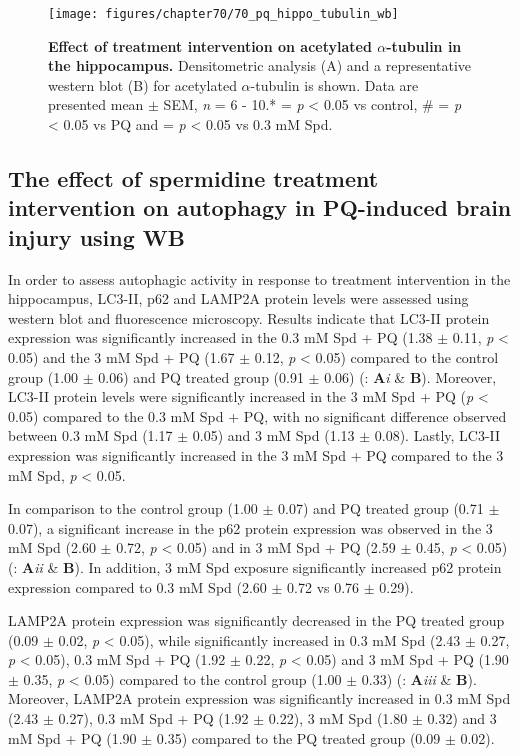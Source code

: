 \begin{figure}[!htbp]
\center
  \texttt{[image: figures/chapter70/70\_pq\_hippo\_tubulin\_wb]}
  \caption[Effect of treatment intervention on acetylated $\alpha$-tubulin expression in the hippocampus]{\textbf{Effect of treatment intervention on acetylated $\alpha$-tubulin in the hippocampus.} Densitometric analysis (A) and a representative western blot (B) for acetylated $\alpha$-tubulin is shown. Data are presented  mean $\pm$ SEM, \textit{n} = 6 - 10.* = \textit{p} < 0.05 vs control, \# = \textit{p} < 0.05 vs PQ and \@ = \textit{p} < 0.05 vs 0.3 mM Spd.}
  \label{fig:70_pq_hippo_tubulin_wb}
\end{figure} 

\subsection{The effect of spermidine treatment intervention on autophagy in PQ-induced brain injury using WB}
In order to assess autophagic activity in response to treatment intervention in the hippocampus, LC3-II, p62 and LAMP2A protein levels were assessed using western blot and fluorescence microscopy. Results indicate that LC3-II protein expression was significantly increased in the 0.3 mM Spd + PQ (1.38 $\pm$ 0.11, \textit{p} < 0.05) and the 3 mM Spd + PQ (1.67 $\pm$ 0.12, \textit{p} < 0.05) compared to the control group (1.00 $\pm$ 0.06) and PQ treated group (0.91 $\pm$ 0.06) (: \textbf{A}\textit{i} \& \textbf{B}). Moreover, LC3-II protein levels were significantly increased in the 3 mM Spd + PQ (\textit{p} < 0.05) compared to the 0.3 mM Spd + PQ, with no significant difference observed between 0.3 mM Spd (1.17 $\pm$ 0.05) and 3 mM Spd (1.13 $\pm$ 0.08). Lastly, LC3-II expression was significantly increased in the 3 mM Spd + PQ compared to the 3 mM Spd, \textit{p} < 0.05.

In comparison to the control group (1.00 $\pm$ 0.07) and PQ treated group (0.71 $\pm$ 0.07), a significant increase in the p62 protein expression was observed in the 3 mM Spd (2.60 $\pm$ 0.72, \textit{p} < 0.05) and in 3 mM Spd + PQ (2.59 $\pm$ 0.45, \textit{p} < 0.05) (: \textbf{A}\textit{ii} \& \textbf{B}). In addition, 3 mM Spd exposure significantly increased p62 protein expression compared to 0.3 mM Spd (2.60 $\pm$ 0.72 vs 0.76 $\pm$ 0.29).

LAMP2A protein expression was significantly decreased in the PQ treated group (0.09 $\pm$ 0.02, \textit{p} < 0.05), while significantly increased in 0.3 mM Spd (2.43 $\pm$ 0.27, \textit{p} < 0.05), 0.3 mM Spd + PQ (1.92 $\pm$ 0.22, \textit{p} < 0.05) and 3 mM Spd + PQ (1.90 $\pm$ 0.35, \textit{p} < 0.05) compared to the control group (1.00 $\pm$ 0.33) (: \textbf{A}\textit{iii} \& \textbf{B}). Moreover, LAMP2A protein expression was significantly increased in 0.3 mM Spd (2.43 $\pm$ 0.27), 0.3 mM Spd + PQ (1.92 $\pm$ 0.22), 3 mM Spd (1.80 $\pm$ 0.32) and 3 mM Spd + PQ (1.90 $\pm$ 0.35) compared to the PQ treated group (0.09 $\pm$ 0.02).

